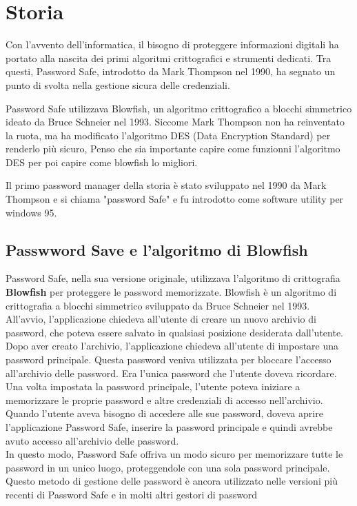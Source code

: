 \documentclass[a4paper,12pt]{report}
\begin{document}
	\chapter{Storia} 
		Con l’avvento dell’informatica, il bisogno di proteggere informazioni
		digitali ha portato alla nascita dei primi algoritmi crittografici e
		strumenti dedicati. Tra questi, Password Safe, introdotto da Mark Thompson
		nel 1990, ha segnato un punto di svolta nella gestione sicura delle
		credenziali.

		Password Safe utilizzava Blowfish, un algoritmo crittografico a blocchi
		simmetrico ideato da Bruce Schneier nel 1993.
		Siccome Mark Thompson non ha reinventato la ruota, ma ha modificato
		l'algoritmo DES (Data Encryption Standard) per renderlo più sicuro, 
		Penso che sia importante capire come funzionni l'algoritmo DES per
		poi capire come blowfish lo migliori. 

		Il primo password manager della storia è stato sviluppato nel 1990 da Mark
		Thompson \cite{password-manager-hystory} e si chiama "password Safe" e 
		fu introdotto come software utility per windows 95. 

		\section{Passwword Save e l'algoritmo di Blowfish}
		Password Safe, nella sua versione originale, utilizzava l'algoritmo di
		crittografia \textbf{Blowfish} per proteggere le password memorizzate.
		Blowfish è un algoritmo di crittografia a blocchi simmetrico sviluppato da
		Bruce Schneier nel 1993.\\
		All'avvio, l'applicazione chiedeva all'utente di creare un nuovo archivio di
		password, che poteva essere salvato in qualsiasi posizione desiderata
		dall'utente. Dopo aver creato l'archivio, l'applicazione chiedeva all'utente di
		impostare una password principale. Questa password veniva utilizzata per
		bloccare l'accesso all'archivio delle password. Era l'unica password che
		l'utente doveva ricordare.\\
		Una volta impostata la password principale, l'utente poteva iniziare a
		memorizzare le proprie password e altre credenziali di accesso nell'archivio.
		Quando l'utente aveva bisogno di accedere alle sue password, doveva aprire
		l'applicazione Password Safe, inserire la password principale e quindi avrebbe
		avuto accesso all'archivio delle password.\\
		In questo modo, Password Safe offriva un modo sicuro per memorizzare tutte le
		password in un unico luogo, proteggendole con una sola password principale.
		Questo metodo di gestione delle password è ancora utilizzato nelle versioni più
		recenti di Password Safe e in molti altri gestori di password
\end{document}
